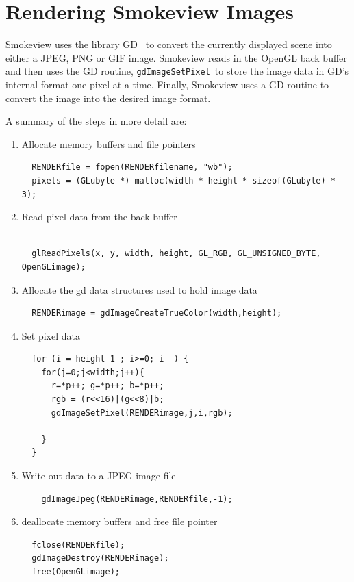 \documentclass[11pt,twoside]{book}
\begin{document}
%
%

\chapter{Rendering Smokeview Images}

Smokeview uses the library GD~\cite{GDLIB} to convert the
currently displayed scene into either a JPEG, PNG or GIF image.
Smokeview reads in the OpenGL back buffer and then uses the GD
routine, {\tt gdImageSetPixel}\ to store the image data in GD's
internal format one pixel at a time.    Finally, Smokeview uses a
GD routine to convert the image into the desired image format.

A summary of the steps in more detail are:
\begin{enumerate}
\item Allocate memory buffers and file pointers
\begin{lstlisting}
  RENDERfile = fopen(RENDERfilename, "wb");
  pixels = (GLubyte *) malloc(width * height * sizeof(GLubyte) * 3);
\end{lstlisting}

\item Read pixel data from the back buffer
\begin{lstlisting}

  glReadPixels(x, y, width, height, GL_RGB, GL_UNSIGNED_BYTE, OpenGLimage);
\end{lstlisting}
\item Allocate the gd data structures used to hold image data
\begin{lstlisting}
  RENDERimage = gdImageCreateTrueColor(width,height);
\end{lstlisting}

\item Set pixel data

\begin{lstlisting}
  for (i = height-1 ; i>=0; i--) {
    for(j=0;j<width;j++){
      r=*p++; g=*p++; b=*p++;
      rgb = (r<<16)|(g<<8)|b;
      gdImageSetPixel(RENDERimage,j,i,rgb);

    }
  }
\end{lstlisting}

\item Write out data to a JPEG image file

\begin{lstlisting}
    gdImageJpeg(RENDERimage,RENDERfile,-1);
\end{lstlisting}

\item deallocate memory buffers and free file pointer

\begin{lstlisting}
  fclose(RENDERfile);
  gdImageDestroy(RENDERimage);
  free(OpenGLimage);
\end{lstlisting}

\end{enumerate}
\end{document}
